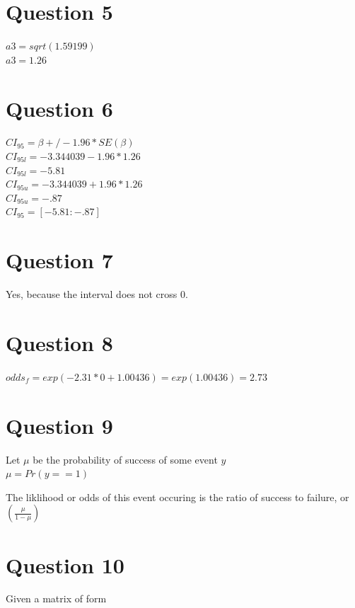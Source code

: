\documentclass{article}
\begin{document}
\section*{Question 5}

$a3 = sqrt(1.59199)$ ~\\
$a3 = 1.26$ ~\\

\section*{Question 6}

$CI_{95} = \beta+/-1.96*SE(\beta)$ ~\\
$CI_{95l} = -3.344039-1.96*1.26$ ~\\
$CI_{95l} = -5.81$ ~\\

$CI_{95u} = -3.344039+1.96*1.26$ ~\\
$CI_{95u} = -.87$ ~\\

$CI_{95} = [-5.81:-.87]$ ~\\

\section*{Question 7}
Yes, because the interval does not cross $0$. ~\\

\section*{Question 8}

$odds_f = exp(-2.31*0 + 1.00436) = exp(1.00436) = 2.73$ ~\\

\section*{Question 9}
Let $\mu$ be the probability of success of some event $y$ ~\\

$\mu = Pr(y==1)$~

The liklihood or odds of this event occuring is the ratio of success to failure, or ~\\

$ (\frac{\mu}{1-\mu})$

\section*{Question 10}
Given a matrix of form ~\\
\end{document}

